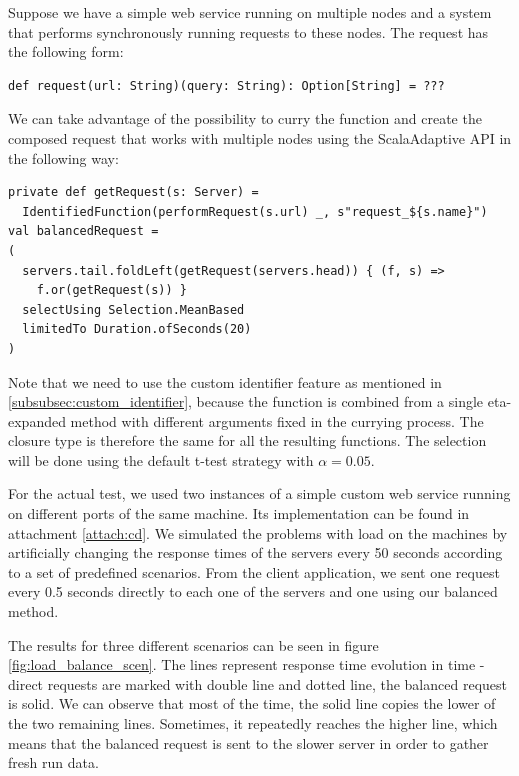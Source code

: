 Suppose we have a simple web service running on multiple nodes and a system that performs synchronously running requests to these nodes. The request has the following form:

\lstset{style=Scala}
\begin{lstlisting}
def request(url: String)(query: String): Option[String] = ???
\end{lstlisting}

We can take advantage of the possibility to curry the function and create the composed request that works with multiple nodes using the ScalaAdaptive API in the following way:

\lstset{style=Scala}
\begin{lstlisting}
private def getRequest(s: Server) = 
  IdentifiedFunction(performRequest(s.url) _, s"request_${s.name}")
val balancedRequest =
(
  servers.tail.foldLeft(getRequest(servers.head)) { (f, s) =>
    f.or(getRequest(s)) }
  selectUsing Selection.MeanBased
  limitedTo Duration.ofSeconds(20)
)
\end{lstlisting}

Note that we need to use the custom identifier feature as mentioned in \ref{subsubsec:custom_identifier}, because the function is combined from a single eta-expanded method with different arguments fixed in the currying process. The closure type is therefore the same for all the resulting functions. The selection will be done using the default t-test strategy with $\alpha = 0.05$.

For the actual test, we used two instances of a simple custom web service running on different ports of the same machine. Its implementation can be found in attachment \ref{attach:cd}. We simulated the problems with load on the machines by artificially changing the response times of the servers every 50 seconds according to a set of predefined scenarios. From the client application, we sent one request every 0.5 seconds directly to each one of the servers and one using our balanced method. 

The results for three different scenarios can be seen in figure \ref{fig:load_balance_scen}. The lines represent response time evolution in time - direct requests are marked with double line and dotted line, the balanced request is solid. We can observe that most of the time, the solid line copies the lower of the two remaining lines. Sometimes, it repeatedly reaches the higher line, which means that the balanced request is sent to the slower server in order to gather fresh run data.

